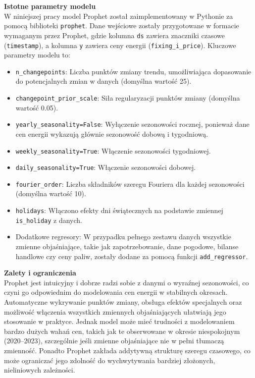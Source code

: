 \textbf{Istotne parametry modelu} \\
W niniejszej pracy model Prophet został zaimplementowany w Pythonie za pomocą biblioteki \texttt{prophet}. Dane wejściowe zostały przygotowane w formacie wymaganym przez Prophet, gdzie kolumna \texttt{ds} zawiera znaczniki czasowe (\texttt{timestamp}), a kolumna \texttt{y} zawiera ceny energii (\texttt{fixing\_i\_price}). Kluczowe parametry modelu to:
\begin{itemize}
    \item \texttt{n\_changepoints}: Liczba punktów zmiany trendu, umożliwiająca dopasowanie do potencjalnych zmian w danych (domyślna wartość 25).
    \item \texttt{changepoint\_prior\_scale}: Siła regularyzacji punktów zmiany (domyślna wartość 0.05).
    \item \texttt{yearly\_seasonality=False}: Wyłączenie sezonowości rocznej, ponieważ dane cen energii wykazują głównie sezonowość dobową i tygodniową.
    \item \texttt{weekly\_seasonality=True}: Włączenie sezonowości tygodniowej.
    \item \texttt{daily\_seasonality=True}: Włączenie sezonowości dobowej.
    \item \texttt{fourier\_order}: Liczba składników szeregu Fouriera dla każdej sezonowości (domyślna wartość 10).
    \item \texttt{holidays}: Włączono efekty dni świątecznych na podstawie zmiennej \texttt{is\_holiday} z danych.
    \item Dodatkowe regresory: W przypadku pełnego zestawu danych wszystkie zmienne objaśniające, takie jak zapotrzebowanie, dane pogodowe, bilanse handlowe czy ceny paliw, zostały dodane za pomocą funkcji \texttt{add\_regressor}.
\end{itemize}

\textbf{Zalety i ograniczenia} \\
Prophet jest intuicyjny i dobrze radzi sobie z danymi o wyraźnej sezonowości, co czyni go odpowiednim do modelowania cen energii w stabilnych okresach. Automatyczne wykrywanie punktów zmiany, obsługa efektów specjalnych oraz możliwość włączenia wszystkich zmiennych objaśniających ułatwiają jego stosowanie w praktyce. Jednak model może mieć trudności z modelowaniem bardzo dużych wahań cen, takich jak te obserwowane w okresie niespokojnym (2020--2023), szczególnie jeśli zmienne objaśniające nie w pełni tłumaczą zmienność. Ponadto Prophet zakłada addytywną strukturę szeregu czasowego, co może ograniczać jego zdolność do wychwytywania bardziej złożonych, nieliniowych zależności.

